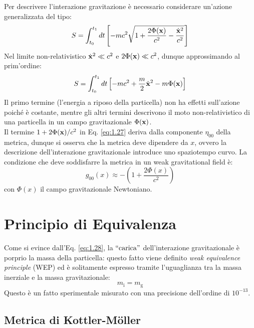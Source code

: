 Per descrivere l'interazione gravitazione è necessario considerare un'azione generalizzata del tipo:
\begin{equation}
  S = \int_{t_0}^{t_1} dt \left[ -mc^2 \sqrt{1 + \frac{2\Phi(\mathbf{x})}{c^2} - \frac{\dot{\mathbf{x}}^2}{c^2}} \right]
  \label{eq:1.27}
\end{equation}
Nel limite non-relativistico $ \dot{\mathbf{x}}^2 \ll c^2 $ e $ 2\Phi(\mathbf{x}) \ll c^2 $, dunque approssimando al prim'ordine:
\begin{equation}
  S = \int_{t_0}^{t_1} dt \left[ -mc^2 + \frac{m}{2}\dot{\mathbf{x}}^2 - m\Phi(\mathbf{x}) \right]
  \label{eq:1.28}
\end{equation}
Il primo termine (l'energia a riposo della particella) non ha effetti sull'azione poiché è costante, mentre gli altri termini descrivono il moto non-relativistico di una particella in un campo gravitazionale $ \Phi(\mathbf{x}) $.\\
Il termine $ 1 + 2\Phi(\mathbf{x})/c^2 $ in Eq. \ref{eq:1.27} deriva dalla componente $ \eta_{00} $ della metrica, dunque si osserva che la metrica deve dipendere da $ x $, ovvero la descrizione dell'interazione gravitazionale introduce uno spaziotempo curvo. La condizione che deve soddisfarre la metrica in un weak gravitational field è:
\begin{equation}
  g_{00}(x) \approx - \left( 1 + \frac{2\Phi(x)}{c^2} \right)
  \label{eq:1.29}
\end{equation}
con $ \Phi(x) $ il campo gravitazionale Newtoniano.

\section{Principio di Equivalenza}

Come si evince dall'Eq. \ref{eq:1.28}, la $ ``\text{carica}" $ dell'interazione gravitazionale è porprio la massa della particella: questo fatto viene definito \textit{weak equivalence principle} (WEP) ed è solitamente espresso tramite l'uguaglianza tra la massa inerziale e la massa gravitazionale:
\begin{equation}
  m_{\text{i}} = m_{\text{g}}
  \label{eq:1.30}
\end{equation}
Questo è un fatto sperimentale misurato con una precisione dell'ordine di $ 10^{-13} $.

\subsection{Metrica di Kottler-Möller}

